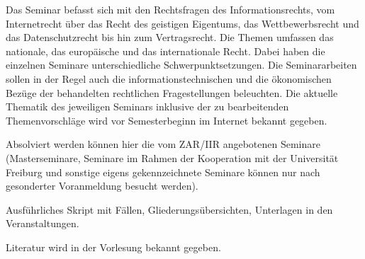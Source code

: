 \begin{course}
\begin{learningoutcomes}
\end{learningoutcomes}

\begin{content}
Das Seminar befasst sich mit den Rechtsfragen des Informationsrechts, vom Internetrecht über das Recht des geistigen Eigentums, das Wettbewerbsrecht und das Datenschutzrecht bis hin zum Vertragsrecht. Die Themen umfassen das nationale, das europäische und das internationale Recht. Dabei haben die einzelnen Seminare unterschiedliche Schwerpunktsetzungen. Die Seminararbeiten sollen in der Regel auch die informationstechnischen und die ökonomischen Bezüge der behandelten rechtlichen Fragestellungen beleuchten. Die aktuelle Thematik des jeweiligen Seminars inklusive der zu bearbeitenden Themenvorschläge wird vor Semesterbeginn im Internet bekannt gegeben.

 

Absolviert werden können hier die vom ZAR/IIR angebotenen Seminare (Masterseminare, Seminare im Rahmen der Kooperation mit der Universität Freiburg und sonstige eigens gekennzeichnete Seminare können nur nach gesonderter Voranmeldung besucht werden).


\end{content}

\begin{media}Ausführliches Skript mit Fällen, Gliederungsübersichten, Unterlagen in den Veranstaltungen.

\end{media}

\begin{literature}Literatur wird in der Vorlesung bekannt gegeben.

\end{literature}



\end{course}